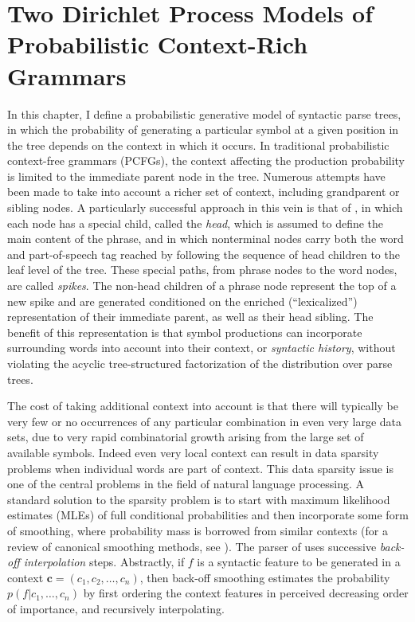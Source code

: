 \documentclass[12pt,letterpaper]{report}
\begin{document}
\chapter{Two Dirichlet Process Models of Probabilistic Context-Rich Grammars}

In this chapter, I define a probabilistic generative model of syntactic parse trees, in
which the probability of generating a particular symbol at a given
position in the tree depends on the context in which it occurs.  In
traditional probabilistic context-free grammars (PCFGs), the context
affecting the production probability is limited to the immediate
parent node in the tree.  Numerous attempts have been made to take
into account a richer set of context, including grandparent or sibling
nodes.  A particularly successful approach in this vein is that of 
\cite{collins1997three,collins2003head}, in which
each node has a special child, called the {\em head}, 
which is assumed to define the main content of the phrase, and in
which nonterminal nodes carry both the word and part-of-speech tag 
reached by following the sequence of head children to the leaf level of the tree.
These special paths, from phrase nodes to the word nodes, are called
{\em spikes}.  The non-head children of a phrase node represent the
top of a new spike and are generated conditioned on the enriched
(``lexicalized'') representation of their immediate parent, as well as
their head sibling.  The benefit of this representation is that
symbol productions can incorporate surrounding words into account into
their context, or {\it syntactic history}, without
violating the acyclic tree-structured factorization of the
distribution over parse trees.

The cost of taking additional context into account is that
there will typically be very few or no occurrences of any particular
combination in even very large data sets, due to very rapid combinatorial growth
arising from the large set of available
symbols.  Indeed even very local context can result in data sparsity problems
when individual words are part of context.  This data sparsity issue is one of the
central problems in the field of natural language processing.
A standard solution to the sparsity problem 
is to start with maximum likelihood estimates (MLEs) of full conditional
probabilities and then incorporate some form of smoothing, where
probability mass is borrowed from similar contexts (for a review of
canonical smoothing methods, see \cite{chen1999empirical}).  The
parser of \cite{collins2003head} uses successive {\it back-off
interpolation} steps.  Abstractly, if $f$ is a syntactic feature to be
generated in a context $\mathbf{c} = (c_1, c_2, \dots, c_n)$, then
back-off smoothing estimates the probability $p(f \vert c_1, \dots,
c_n)$ by first ordering the context features in perceived decreasing
order of importance, and recursively interpolating.  
\end{document}
